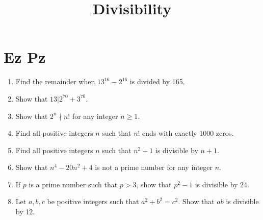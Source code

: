 \documentclass[12pt]{scrartcl}
\title{Divisibility}
\begin{document}
\renewcommand*\contentsname{Daftar Isi}
\tableofcontents

\newpage
\section{Ez Pz}
\begin{enumerate}
    \item Find the remainder when $13^{16} - 2^{16}$ is divided by 165.

    \item Show that $13 | 2^{70} + 3^{70}$.

    \item Show that $2^n \nmid n!$ for any integer $n \ge 1$.

    \item Find all positive integers $n$ such that $n!$ ends with exactly 1000 zeros.

    \item Find all positive integers $n$ such that $n^2+1$ is divisible by $n+1$.

    \item Show that $n^4 - 20n^2 + 4$ is not a prime number for any integer $n$.

    \item If $p$ is a prime number such that $p > 3$, show that $p^2-1$ is divisible by 24.

    \item Let $a, b, c$ be positive integers such that $a^2+b^2=c^2$. Show that $ab$ is divisible by 12.
\end{enumerate}
\end{document}
